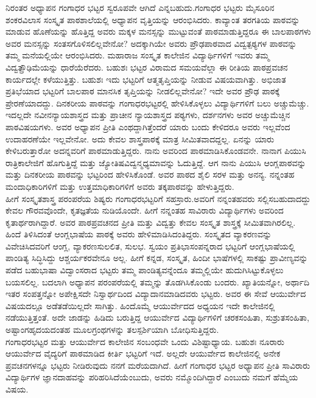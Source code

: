 {ನಿರಂತರ ಅಧ್ಯಾಪನ ಗಂಗಾಧರ ಭಟ್ಟರ ಸ್ವರೂಪವೇ ಆಗಿದೆ ಎನ್ನಬಹುದು.\break ಗಂಗಾಧರ ಭಟ್ಟರು ಮೈಸೂರಿನ ಶಂಕರವಿಲಾಸ ಸಂಸ್ಕೃತ ಪಾಠಶಾಲೆಯಲ್ಲಿ ಅಧ್ಯಾಪನ ವೃತ್ತಿಯನ್ನು ಆರಂಭಿಸಿದರು. ಕಾವ್ಯಾಂತ ತರಗತಿಯ ಪಾಠವನ್ನು ಮಾಡುವ ಹೊಣೆಯನ್ನು ಹೊತ್ತಿದ್ದ ಅವರು ಮಕ್ಕಳ ಮನಸ್ಸನ್ನು ಮುಟ್ಟುವಂತೆ ಪಾಠಮಾಡುತ್ತಿದ್ದರೂ ಈ ಬಾಲ\-ಪಾಠಗಳು ಅವರ ಮನಸ್ಸನ್ನು ಸಂತಸಗೊಳಿಸಲಿಲ್ಲವೇನೋ? ಅದಕ್ಕಾಗಿಯೇ ಅವರು ಪ್ರೌಢ\-ಪಾಠವಾದ ವಿದ್ವತ್ಪಠ್ಯಗಳ ಪಾಠವನ್ನು ತಮ್ಮ ಮನೆಯಲ್ಲಿಯೇ ಆರಂಭಿಸಿದರು. ಮಹಾರಾಜ ಸಂಸ್ಕೃತ ಕಾಲೇಜಿನ ವಿದ್ಯಾರ್ಥಿಗಳಿಗೆ ಇವರು ತಮ್ಮ ವಿದ್ವತ್ಪ್ರೌಢಿಮೆಯನ್ನು ಧಾರೆ\-ಯೆರೆದರು. ಬಹುಶಃ ಭಟ್ಟರ ವಿರಾಮದ ಸಮಯವೆಲ್ಲಾ ಈ ರೀತಿಯ ಪಾಠ\-ಪ್ರವಚನ ಕಾರ್ಯದಲ್ಲೇ ಕಳೆಯುತ್ತಿತ್ತು. ಬಹುಶಃ ಇದು ಭಟ್ಟರಿಗೆ ಆತ್ಮತೃಪ್ತಿಯನ್ನು ನೀಡುವ ವಿಷಯವಾಗಿತ್ತು. ಅಭಿಜಾತ ಪ್ರತಿಭೆಯಾದ ಭಟ್ಟರಿಗೆ ಬಾಲಪಾಠ ಮಾನಸಿಕ ತೃಪ್ತಿಯನ್ನು ನೀಡಲಿಲ್ಲವೇನೋ? ಇದೇ ಅವರ ಪ್ರೌಢ ಪಾಠಕ್ಕೆ  ಪ್ರೇರಣೆಯಾದದ್ದು. ದಿನಕರೀಯ ಪಾಠವನ್ನು ಗಂಗಾಧರಭಟ್ಟರಲ್ಲಿ ಹೇಳಿಸಿಕೊಳ್ಳಲು ವಿದ್ಯಾರ್ಥಿ\-ಗಳಿಗೆ ಬಲು ಅಚ್ಚುಮೆಚ್ಚು. ಇದಲ್ಲದೇ ನವೀನನ್ಯಾಯಶಾಸ್ತ್ರದ ಮತ್ತು ಪ್ರಾಚೀನ ನ್ಯಾಯಶಾಸ್ತ್ರದ ಪಠ್ಯಗಳು, ದರ್ಶನಗಳು ಅವರ ಅಚ್ಚುಮೆಚ್ಚಿನ ಪಾಠವಿಷಯಗಳು. ಅವರ ಅಧ್ಯಾಪನ ಪ್ರೀತಿ ಎಂಥದ್ದಾಗಿತ್ತೆಂದರೆ ಯಾರು ಬಂದು ಕೇಳಿದರೂ ಅವರು ಇಲ್ಲವೆಂದ ಉದಾಹರಣೆಯೇ ಇಲ್ಲವೇನೋ. ಅದು ಕೇವಲ ಶಾಸ್ತ್ರಪಾಠಕ್ಕೆ ಮಾತ್ರ ಸೀಮಿತವಾದದ್ದಲ್ಲ. ಏನನ್ನು ಯಾರು ಕೇಳಿಬರುತ್ತಾರೋ ಅದನ್ನವರಿಗೆ ಪಾಠಮಾಡುತ್ತಿದ್ದರು. ನಾನು ಅವರಿಂದ ಪಾಠಮಾಡಿಸಿಕೊಂಡವನೇ. ನಾನಾಗ ಪಿಯುಸಿ ರಾತ್ರಿಕಾಲೇಜಿಗೆ ಹೊಗುತ್ತಿದ್ದೆ ಮತ್ತು ಜ್ಯೋತಿಷ\-ವಿದ್ವನ್ಮಧ್ಯಮಾವನ್ನು ಓದುತ್ತಿದ್ದೆ. ಆಗ ನಾನು ಪಿಯುಸಿ ಆಂಗ್ಲಪಾಠವನ್ನು ಮತ್ತು ದಿನಕರೀಯ ಪಾಠವನ್ನು ಭಟ್ಟರಿಂದ ಹೇಳಿಸಿಕೊಂಡೆ. ಅವರ ಪಾಠದ ಶೈಲಿ ಸರಳ ಮತ್ತು ಅನನ್ಯ. ನನ್ನಂತಹ ಮಂದಾಧಿಕಾರಿಗಳಿಗೆ ಮತ್ತು ಉತ್ತಮಾಧಿಕಾರಿಗಳಿಗೆ ಅವರು ತಕ್ಕಪಾಠವನ್ನು ಹೇಳುತ್ತಿದ್ದರು.
~\\[0.4cm]
ಹೀಗೆ ಸಂಸ್ಕೃತಶಾಸ್ತ್ರ ಪರಂಪರೆಯ ಶಿಷ್ಯರು ಗಂಗಾಧರಭಟ್ಟರಿಗೆ ಸಹಸ್ರಾರು.\break ಅವರಿಗೆ ನನ್ನಂತಹವರು ಸಲ್ಲಿಸಬಹುದಾದದ್ದು ಕೇವಲ ಗೌರವವೊಂದೇ, ಕೃತಜ್ಞತೆಯ ನುಡಿಯೊಂದೇ. ಹೀಗೆ ನನ್ನಂತಹ ಸಾವಿರಾರು ವಿದ್ಯಾರ್ಥಿಗಳು ಅವರಿಂದ ಕೃತಾರ್ಥ\-ರಾಗಿದ್ದಾರೆ. ಅವರ ಪಾಠಪ್ರವಚನದ ಪ್ರೀತಿ ಮತ್ತು ವಿದ್ವತ್ತು ಕೇವಲ ಸಂಸ್ಕೃತ ಶಾಸ್ತ್ರಕ್ಕೆ ಸೀಮಿತವಾಗಿರಲಿಲ್ಲ. ಹಿಂದೆ ತಿಳಿಸಿದಂತೆ ಆಂಗ್ಲಭಾಷೆಯ ಪಾಠಕ್ಕೆ ಅವರು ಹೇಳಿ\break ಮಾಡಿಸಿದಂತಿದ್ದರು. ಸಂಸ್ಕೃತದ ವ್ಯಾಕರಣವನ್ನು ವಿವೇಚಿಸಿದವರಿಗೆ ಆಂಗ್ಲ, ವ್ಯಾಕರಣ\break ಸುಲಲಿತ, ಸುಲಭ. ಸ್ವಯಂ ಪ್ರತಿಭಾಸಂಪನ್ನರಾದ ಭಟ್ಟರಿಗೆ ಆಂಗ್ಲಭಾಷೆಯಲ್ಲಿ ಪಾಂಡಿತ್ಯ ಸಿದ್ಧಿಸಿದ್ದು ಆಶ್ಚರ್ಯಕರವೇನೂ ಅಲ್ಲ. ಹೀಗೆ ಕನ್ನಡ, ಸಂಸ್ಕೃತ, ಹಿಂದೀ ಭಾಷೆ\-ಗಳಲ್ಲಿ ಸಾಕಷ್ಟು ಪ್ರಾವೀಣ್ಯವನ್ನು ಪಡೆದ ಬಹುಭಾಷಾ ವಿದ್ವಾಂಸರಾದ ಭಟ್ಟರು ತಮ್ಮ ಪಾಂಡಿತ್ಯವನ್ನೆಂದೂ ತಮ್ಮಲ್ಲಿಯೇ ಹುದುಗಿಸಿಟ್ಟುಕೊಳ್ಳಲು ಬಯಸಲಿಲ್ಲ. ಬದಲಾಗಿ ಅಧ್ಯಾಪನ ಪರಂಪರೆಯಲ್ಲಿ ತಮ್ಮನ್ನು ತೊಡಗಿಸಿಕೊಂಡು ಬಂದರು. ಖ್ಯಾತಿಯನ್ನೋ, ಅರ್ಥಾದಿ ಇತರ ಸಂಪತ್ತನ್ನೋ ಅಪೇಕ್ಷಿಸದೇ ನಿಸ್ವಾರ್ಥದಿಂದ ವಿದ್ಯಾದಾನಮಾಡಿದವರು ಭಟ್ಟರು. ಅವರ ಈ ಸೇವೆ ಆಯುರ್ವೇದ ವಿಷಯದಲ್ಲೂ ಅಡೆತಡೆಯಿಲ್ಲದೇ ಸಾಗಿತ್ತು. ಹಿಂದೊಮ್ಮೆ ಆಯುರ್ವೇದದ ಅಧ್ಯಯನ ಇದೇ ಕಾಲೇಜಿನಲ್ಲಿ ನಡೆಯುತ್ತಿತ್ತಂತೆ. ಅದೇ ಜಾಡನ್ನು ಹಿಡಿದು ಬರುತ್ತಿದ್ದ ಆಯುರ್ವೇದ ವಿದ್ಯಾರ್ಥಿಗಳಿಗೆ ಚರಕಸಂಹಿತಾ, ಸುಶ್ರುತ\-ಸಂಹಿತಾ, ಅಷ್ಟಾಂಗಹೃದಯದಂತಹ  ಮೂಲಗ್ರಂಥಗಳನ್ನು ತಲಸ್ಪರ್ಶಿಯಾಗಿ ಬೋಧಿ\-ಸುತ್ತಿದ್ದರು. 
~\\[0.4cm]
ಗಂಗಾಧರಭಟ್ಟರ ಮತ್ತು ಆಯುರ್ವೇದ ಕಾಲೇಜಿನ ಸಂಬಂಧವೇ ಒಂದು ವಿಶಿಷ್ಟಾಧ್ಯಾಯ. ಬಹುಶಃ ನೂರಾರು ಆಯುರ್ವೇದ ವೈದ್ಯರಿಗೆ ಪಾಠಮಾಡಿದ ಕೀರ್ತಿ ಭಟ್ಟರಿಗೆ ಇದೆ. ಅಲ್ಲದೇ ಆಯುರ್ವೇದ ಕಾಲೇಜಿನಲ್ಲಿ ಅನೇಕ ಪ್ರವಚನಗಳನ್ನೂ ಭಟ್ಟರು ನೀಡಿರುವುದು ನನಗೆ ಮರೆಯದಾಗಿದೆ. ಹೀಗೆ ಗಂಗಾಧರ ಭಟ್ಟರ ಅಧ್ಯಾಪನ ಪ್ರೀತಿ ಸಾವಿರಾರು ವಿದ್ಯಾರ್ಥಿಗಳ ಜ್ಞಾನದಾಹವನ್ನು ಪರಿಹರಿಸಿದೆಯೆಂಬುದು, ಅವರು ನಮ್ಮೊಂದಿಗಿದ್ದಾರೆ ಎಂಬುದು ನಮಗೆ ಹೆಮ್ಮೆಯ ವಿಷಯ.

}
